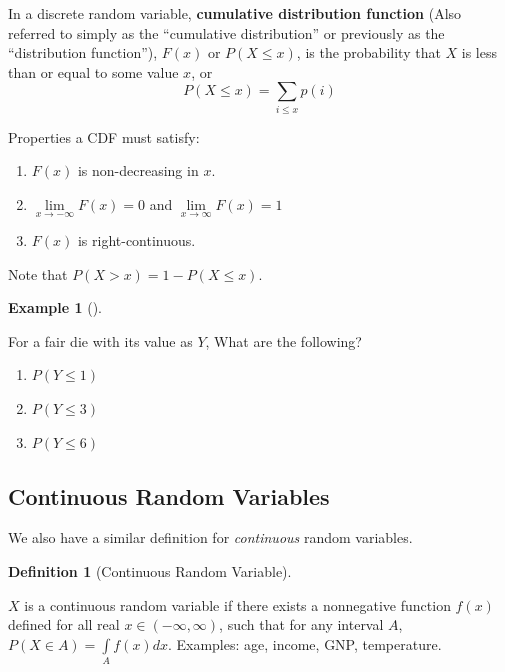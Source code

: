 \documentclass[
  letterpaper,
]{book}
\providecommand{\tightlist}{%
  \setlength{\itemsep}{0pt}\setlength{\parskip}{0pt}}\usepackage{longtable,booktabs,array}
\theoremstyle{definition}
\newtheorem{definition}{Definition}[chapter]
\theoremstyle{definition}
\newtheorem{example}{Example}[chapter]
\theoremstyle{plain}
\theoremstyle{definition}
\theoremstyle{plain}
\theoremstyle{plain}
\theoremstyle{remark}
\begin{document}
In a discrete random variable, \textbf{cumulative distribution function}
(Also referred to simply as the ``cumulative distribution'' or
previously as the ``distribution function''), \(F(x)\) or \(P(X\le x)\),
is the probability that \(X\) is less than or equal to some value \(x\),
or \[P(X\le x)=\sum\limits_{i\le x} p(i)\]

Properties a CDF must satisfy:

\begin{enumerate}
\def\labelenumi{\arabic{enumi}.}
\tightlist
\item
  \(F(x)\) is non-decreasing in \(x\).
\item
  \(\lim\limits_{x \to -\infty} F(x) = 0\) and
  \(\lim\limits_{x \to \infty} F(x) = 1\)
\item
  \(F(x)\) is right-continuous.
\end{enumerate}

Note that \(P(X > x) = 1 - P(X \le x)\).

\leavevmode{}%
\begin{example}[]\label{exm-}

For a fair die with its value as \(Y\), What are the following?

\begin{enumerate}
\def\labelenumi{\arabic{enumi}.}
\tightlist
\item
  \(P(Y\le 1)\)
\item
  \(P(Y\le 3)\)
\item
  \(P(Y\le 6)\)
\end{enumerate}

\end{example}

\hypertarget{continuous-random-variables}{%
\subsection*{Continuous Random
Variables}\label{continuous-random-variables}}

We also have a similar definition for \emph{continuous} random
variables.

\leavevmode{}%
\begin{definition}[Continuous Random Variable]\label{def-}

\(X\) is a continuous random variable if there exists a nonnegative
function \(f(x)\) defined for all real \(x\in (-\infty,\infty)\), such
that for any interval \(A\), \(P(X\in A)=\int\limits_A f(x)dx\).
Examples: age, income, GNP, temperature.

\end{definition}
\end{document}
